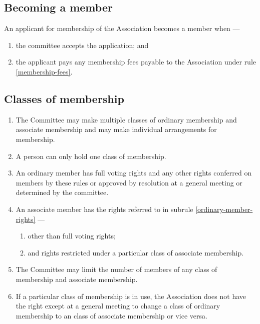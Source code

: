 \documentclass[../constitution.tex]{subfiles}
\begin{document}
\subsection{Becoming a member} \label{becoming-a-member}


An applicant for membership of the Association becomes a member when ---

\begin{enumerate}
\def\labelenumi{\alph{enumi})}
\setcounter{enumi}{0}
\item the committee accepts the application; and
\item the applicant pays any membership fees payable to the Association under rule \ref{membership-fees}.
\end{enumerate}



\subsection{Classes of membership} \label{classes-of-membership}

\begin{enumerate}
\item The Committee may make multiple classes of ordinary membership and associate membership and may make individual arrangements for membership. 
\item A person can only hold one class of membership. 
\item An ordinary member has full voting rights and any other rights conferred on members by these rules or approved by resolution at a general meeting or determined by the committee. \label{ordinary-member-rights}
\item An associate member has the rights referred to in subrule \ref{ordinary-member-rights} --- \label{associate-member-rights}
  \begin{enumerate}
  \item other than full voting rights;
  \item and rights restricted under a particular class of associate membership.
  \end{enumerate}
\item The Committee may limit the number of members of any class of membership and associate membership.
\item \label{swap-ordinary-associate-membership} If a particular class of membership is in use, the Association does not have the right except at a general meeting to change a class of ordinary membership to an class of associate membership or vice versa.
\end{enumerate}
\end{document}
